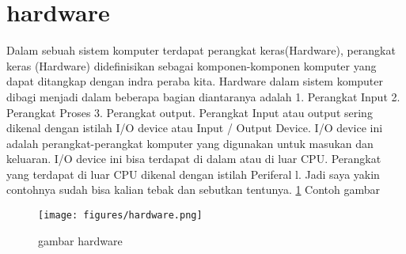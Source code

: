 \section{hardware}
Dalam sebuah sistem komputer terdapat perangkat keras(Hardware), perangkat keras (Hardware) didefinisikan sebagai komponen-komponen komputer yang dapat ditangkap dengan indra peraba kita. Hardware dalam sistem komputer dibagi menjadi dalam beberapa bagian diantaranya adalah
1. Perangkat Input 
2. Perangkat Proses 
3. Perangkat output. 
Perangkat Input atau output sering dikenal dengan istilah I/O device atau Input / Output Device. I/O device ini adalah perangkat-perangkat komputer yang digunakan untuk masukan dan keluaran. I/O device ini bisa terdapat di dalam atau di luar CPU. Perangkat yang terdapat di luar CPU dikenal dengan istilah Periferal l. Jadi saya yakin contohnya sudah bisa kalian tebak dan sebutkan tentunya.
\ref{hardware.png}
Contoh gambar 

\begin{figure}[ht]
\centerline{\texttt{[image: figures/hardware.png]}}
\caption{gambar hardware}
\label{hardware.png}
\end{figure}

